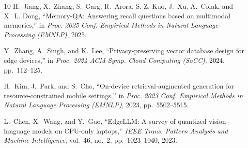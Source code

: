 \documentclass[conference]{IEEEtran}
\begin{document}
\begin{thebibliography}{10}
H.~Jiang, X.~Zhang, S.~Garg, R.~Arora, S.-Z. Kuo, J.~Xu, A.~Colak, and
X.~L. Dong, ``Memory-QA: Answering recall questions based on multimodal
memories,'' in \textit{Proc. 2025 Conf. Empirical Methods in Natural Language
Processing (EMNLP)}, 2025.

Y.~Zhang, A.~Singh, and K.~Lee,
``Privacy-preserving vector database design for edge devices,''
in \textit{Proc. 2024 ACM Symp. Cloud Computing (SoCC)}, 2024, pp.~112--125.

H.~Kim, J.~Park, and S.~Cho,
``On-device retrieval-augmented generation for resource-constrained mobile
settings,'' in \textit{Proc. 2023 Conf. Empirical Methods in Natural Language
Processing (EMNLP)}, 2023, pp.~5502--5515.

L.~Chen, X.~Wang, and Y.~Guo,
``EdgeLLM: A survey of quantized vision--language models on CPU-only laptops,''
\textit{IEEE Trans. Pattern Analysis and Machine Intelligence}, vol.~46, no.~2,
pp.~1023--1040, 2023.

\end{thebibliography}
\end{document}
